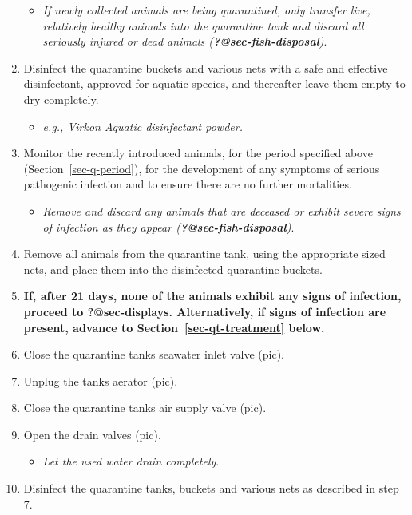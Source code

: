 \documentclass[
  12pt,
]{report}
\providecommand{\tightlist}{%
  \setlength{\itemsep}{0pt}\setlength{\parskip}{0pt}}\usepackage{longtable,booktabs,array}
\begin{document}
\begin{enumerate}
  \begin{itemize}
  \tightlist
  \item
    \emph{If newly collected animals are being quarantined, only
    transfer live, relatively healthy animals into the quarantine tank
    and discard all seriously injured or dead animals
    (\textbf{?@sec-fish-disposal})}.
  \end{itemize}
\item
  Disinfect the quarantine buckets and various nets with a safe and
  effective disinfectant, approved for aquatic species, and thereafter
  leave them empty to dry completely.

  \begin{itemize}
  \tightlist
  \item
    \emph{e.g., Virkon Aquatic disinfectant powder.}
  \end{itemize}
\item
  Monitor the recently introduced animals, for the period specified
  above (Section~\ref{sec-q-period}), for the development of any
  symptoms of serious pathogenic infection and to ensure there are no
  further mortalities.

  \begin{itemize}
  \tightlist
  \item
    \emph{Remove and discard any animals that are deceased or exhibit
    severe signs of infection as they appear
    (\textbf{?@sec-fish-disposal})}.
  \end{itemize}
\item
  Remove all animals from the quarantine tank, using the appropriate
  sized nets, and place them into the disinfected quarantine buckets.
\item
  \textbf{If, after 21 days, none of the animals exhibit any signs of
  infection, proceed to \textbf{?@sec-displays}. Alternatively, if signs
  of infection are present, advance to Section~\ref{sec-qt-treatment}
  below.}
\item
  Close the quarantine tanks seawater inlet valve (pic).
\item
  Unplug the tanks aerator (pic).
\item
  Close the quarantine tanks air supply valve (pic).
\item
  Open the drain valves (pic).

  \begin{itemize}
  \tightlist
  \item
    \emph{Let the used water drain completely}.
  \end{itemize}
\item
  Disinfect the quarantine tanks, buckets and various nets as described
  in step 7.
\end{enumerate}
\end{document}

